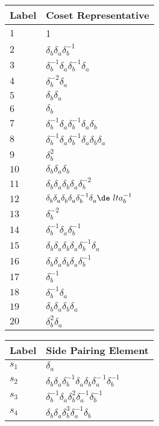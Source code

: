 \documentclass{article}
\begin{document}

\begin{center}
\begin{tabular}{ll}
\toprule
Label & Coset Representative\\
\midrule
$1$ & 1 \\
$2$ & $\delta_b^{}\delta_a^{}\delta_b^{-1}$ \\
$3$ & $\delta_b^{-1}\delta_a^{}\delta_b^{-1}\delta_a^{}$ \\
$4$ & $\delta_b^{-2}\delta_a^{}$ \\
$5$ & $\delta_b^{}\delta_a^{}$ \\
$6$ & $\delta_b^{}$ \\
$7$ & $\delta_b^{-1}\delta_a^{}\delta_b^{-1}\delta_a^{}\delta_b^{}$ \\
$8$ & $\delta_b^{-1}\delta_a^{}\delta_b^{-1}\delta_a^{}\delta_b^{}\delta_a^{}$ 
\\
$9$ & $\delta_b^{2}$ \\
$10$ & $\delta_b^{}\delta_a^{}\delta_b^{}$ \\
$11$ & $\delta_b^{}\delta_a^{}\delta_b^{}\delta_a^{}\delta_b^{-2}$ \\
$12$ & $\delta_b^{}\delta_a^{}\delta_b^{}\delta_a^{}\delta_b^{-1}\delta_a^{}\de\
lta_b^{-1}$ \\
$13$ & $\delta_b^{-2}$ \\
$14$ & $\delta_b^{-1}\delta_a^{}\delta_b^{-1}$ \\
$15$ & $\delta_b^{}\delta_a^{}\delta_b^{}\delta_a^{}\delta_b^{-1}\delta_a^{}$ \\
$16$ & $\delta_b^{}\delta_a^{}\delta_b^{}\delta_a^{}\delta_b^{-1}$ \\
$17$ & $\delta_b^{-1}$ \\
$18$ & $\delta_b^{-1}\delta_a^{}$ \\
$19$ & $\delta_b^{}\delta_a^{}\delta_b^{}\delta_a^{}$ \\
$20$ & $\delta_b^{2}\delta_a^{}$ \\
\bottomrule
\end{tabular}
\hfill
\begin{tabular}{ll}
\toprule
Label & Side Pairing Element\\
\midrule
$s_{1}$ & $\delta_a^{}$ \\
$s_{2}$ & $\delta_b^{}\delta_a^{}\delta_b^{-1}\delta_a^{}\delta_b^{}\delta_a^{-\
1}\delta_b^{-1}$ \\
$s_{3}$ & $\delta_b^{-1}\delta_a^{}\delta_b^{2}\delta_a^{-1}\delta_b^{-1}$ \\
$s_{4}$ & $\delta_b^{}\delta_a^{}\delta_b^{3}\delta_a^{-1}\delta_b^{}$ \\

\end{tabular}
\end{center}
\end{document}

